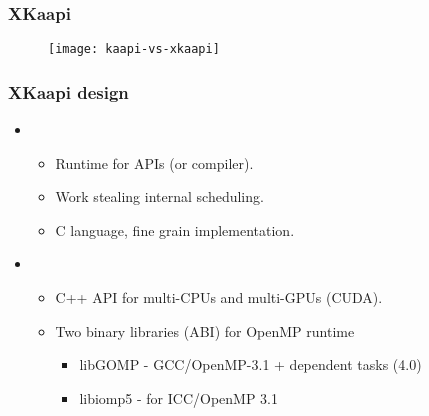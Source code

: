 \begin{frame}[plain]
  \frametitle{XKaapi}
  \begin{figure}[ht]
  \centering
  \texttt{[image: kaapi-vs-xkaapi]}
  \end{figure}
\end{frame}
\begin{frame}
  \frametitle{XKaapi design}
  \begin{itemize}
  \item {}
    \begin{itemize}
    \item Runtime for APIs (or compiler).
    \item Work stealing internal scheduling.
    \item C language, fine grain implementation.
    \end{itemize}
  \end{itemize}

  \begin{itemize}
  \item {}
    \begin{itemize}
    \item C++ API for multi-CPUs and multi-GPUs (CUDA).
    \item Two binary libraries (ABI) for OpenMP runtime
      \begin{itemize}
      \item libGOMP - GCC/OpenMP-3.1 + dependent tasks (4.0)
      \item libiomp5 - for ICC/OpenMP 3.1
      \end{itemize}
    \end{itemize}
  \end{itemize}
\end{frame}
